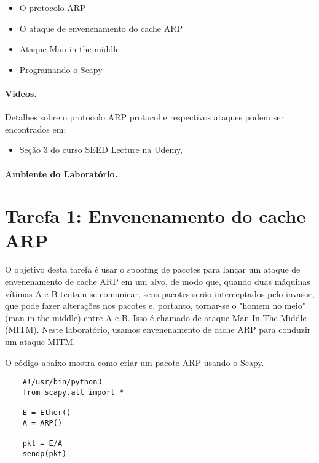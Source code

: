 	\begin{itemize}[noitemsep]
		\item O protocolo ARP
		\item O ataque de envenenamento do cache ARP
		\item Ataque Man-in-the-middle
		\item Programando o Scapy
	\end{itemize}
	
	
	
	\paragraph{Videos.}
	Detalhes sobre o protocolo ARP protocol e respectivos ataques podem ser encontrados em:
	
	\begin{itemize}
		\item Seção 3 do curso SEED Lecture na Udemy, \seedisvideo
	\end{itemize}
	
	
	\paragraph{Ambiente do Laboratório.} \seedenvironment
	
	
	\section{Tarefa 1: Envenenamento do cache ARP}
	
	
	O objetivo desta tarefa é usar o spoofing de pacotes para lançar um ataque de envenenamento de cache ARP em
	um alvo, de modo que, quando duas máquinas vítimas A e B tentam se comunicar, seus 
	pacotes serão interceptados pelo invasor, que pode fazer alterações nos pacotes e, portanto,
	tornar-se o "homem no meio" (man-in-the-middle) entre A e B. Isso é chamado de ataque Man-In-The-Middle (MITM).
	Neste laboratório, usamos envenenamento de cache ARP para conduzir um ataque MITM. 
	
	
	
	O código abaixo mostra como criar um pacote ARP usando o Scapy.
	
	\begin{lstlisting}
	#!/usr/bin/python3
	from scapy.all import *
	
	E = Ether()
	A = ARP()
	
	pkt = E/A
	sendp(pkt)
	\end{lstlisting}
	
